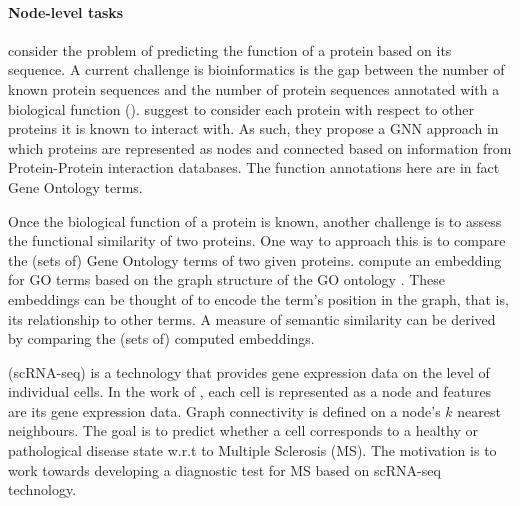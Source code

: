 \documentclass[
	fontsize=10pt, %
	twoside=false, %
	secnumdepth=1, %
  toc=indentunnumbered %
]{kaobook}
\begin{document}
\paragraph{Node-level tasks}
\citeauthor{you_DeepGraphGOGraphNeural_2021}
\cite{you_DeepGraphGOGraphNeural_2021} consider the problem of predicting the
function of a protein based on its sequence. A current challenge is
bioinformatics is the gap between the number of known protein sequences and the
number of protein sequences annotated with a biological function
(). \citeauthor{you_DeepGraphGOGraphNeural_2021}
suggest to consider each protein with respect to other proteins it is known to
interact with. As such, they propose a GNN approach in which proteins are
represented as nodes and connected based on information from Protein-Protein
interaction databases. The function annotations here are in fact Gene Ontology
terms.

Once the biological function of a protein is known, another challenge is to assess the
functional similarity of two proteins. One way to approach this is to compare
the (sets of) Gene Ontology terms of two given proteins. 
\citeauthor{zhong_GO2VecTransformingGO_2020} compute an embedding for GO terms
based on the graph structure of the GO ontology
\cite{zhong_GO2VecTransformingGO_2020}.
These embeddings can be thought
of to encode the term's position in the graph, that is, its relationship to
other terms. A measure of semantic similarity can be derived by comparing the
(sets of) computed embeddings.

 (scRNA-seq) is a technology that provides gene
expression data on the level of individual cells. In the work of
\citeauthor{ravindra_disease_2020} \cite{ravindra_disease_2020}, each cell is
represented as a node and features are its gene expression data. Graph
connectivity is defined on a node's $k$ nearest neighbours. The goal is to
predict whether a cell corresponds to a healthy or pathological disease state
w.r.t to Multiple Sclerosis (MS). The motivation is to work towards developing a
diagnostic test for MS based on scRNA-seq technology.

\end{document}
